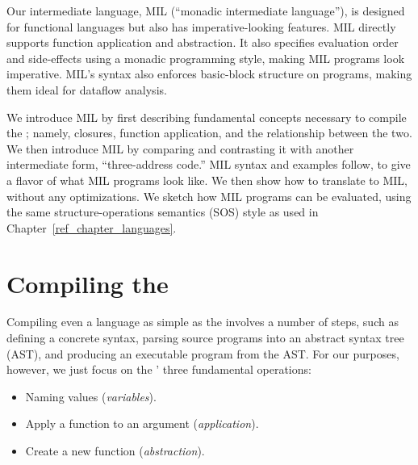 \documentclass[12pt]{report}
\begin{document}
Our intermediate language, MIL (``monadic intermediate language''), is
designed for functional languages but also has imperative-looking
features. MIL directly supports function application and
abstraction. It also specifies evaluation order and side-effects using
a monadic programming style, making MIL programs look
imperative. MIL's syntax also enforces basic-block structure on
programs, making them ideal for dataflow analysis.

We introduce MIL by first describing fundamental concepts necessary to
compile the \lamA; namely, closures, function application, and the
relationship between the two. We then introduce MIL by comparing and
contrasting it with another intermediate form, ``three-address code.''
MIL syntax and examples follow, to give a flavor of what MIL programs
look like. We then show how to translate \lamC to MIL, without any
optimizations. We sketch how MIL programs can be evaluated, using the
same structure-operations semantics (SOS) style as used in
Chapter~\ref{ref_chapter_languages}.







\section{Compiling the \LamA}
\label{lang_sec1}

Compiling even a language as simple as the \lamA involves a number of
steps, such as defining a concrete syntax, parsing source programs
into an abstract syntax tree (AST), and producing an executable
program from the AST. For our purposes, however, we just focus on the
\lamA' three fundamental operations:

\begin{itemize}
\item Naming values (\emph{variables}).
\item Apply a function to an argument (\emph{application}).
\item Create a new function (\emph{abstraction}). 
\end{itemize}
\end{document}
